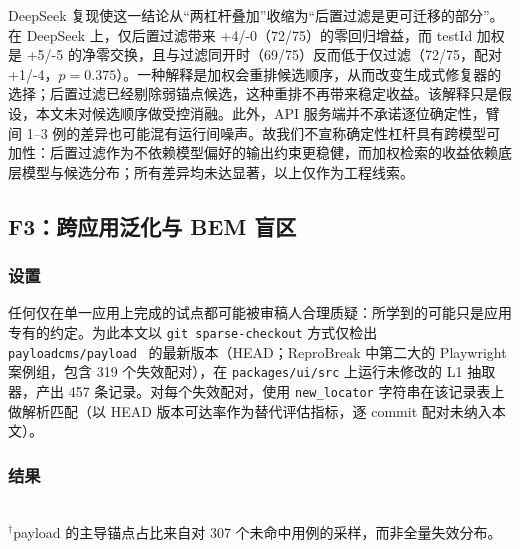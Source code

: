 DeepSeek 复现使这一结论从“两杠杆叠加”收缩为“后置过滤是更可迁移的部分”。在 DeepSeek 上，仅后置过滤带来 +4/-0（72/75）的零回归增益，而 testId 加权是 +5/-5 的净零交换，且与过滤同开时（69/75）反而低于仅过滤（72/75，配对 +1/-4，$p=0.375$）。一种解释是加权会重排候选顺序，从而改变生成式修复器的选择；后置过滤已经剔除弱锚点候选，这种重排不再带来稳定收益。该解释只是假设，本文未对候选顺序做受控消融。此外，API 服务端并不承诺逐位确定性，臂间 1--3 例的差异也可能混有运行间噪声。故我们不宣称确定性杠杆具有跨模型可加性：后置过滤作为不依赖模型偏好的输出约束更稳健，而加权检索的收益依赖底层模型与候选分布；所有差异均未达显著，以上仅作为工程线索。

\subsection{F3：跨应用泛化与 BEM 盲区}
\label{sec:f3}

\subsubsection{设置}
任何仅在单一应用上完成的试点都可能被审稿人合理质疑：所学到的可能只是应用专有的约定。为此本文以 \texttt{git sparse-checkout} 方式仅检出 \texttt{payloadcms/payload}~\cite{payloadCMS} 的最新版本（HEAD；ReproBreak 中第二大的 Playwright 案例组，包含 319 个失效配对），在 \texttt{packages/ui/src} 上运行未修改的 L1 抽取器，产出 457 条记录。对每个失效配对，使用 \texttt{new\_locator} 字符串在该记录表上做解析匹配（以 HEAD 版本可达率作为替代评估指标，逐 commit 配对未纳入本文）。

\subsubsection{结果}
\begin{table}[t]
\centering
\caption{跨应用 L1 可达率（\S\ref{sec:f3}）。原始下降是真实的，但成因可诊断。}
\label{tab:cross-app}
\small
{}
\\[2pt]
{\scriptsize $^\dagger$payload 的主导锚点占比来自对 307 个未命中用例的采样，而非全量失效分布。}
\end{table}

